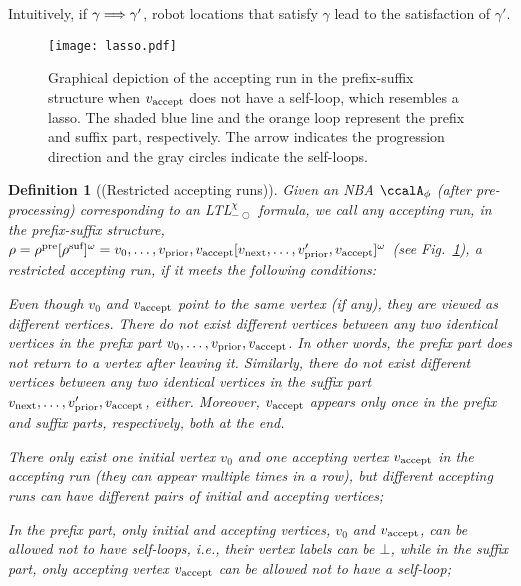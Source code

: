 \documentclass[Afour,sageh,times]{sagej}
\newtheorem{defn}[thm]{Definition}
\newcounter{listcounter}
\newenvironment{noindlist}
 {\begin{list}{(\alph{listcounter})~~}{\usecounter{listcounter} \labelsep=0em \labelwidth=0em \leftmargin=0em \itemindent=0em}}
 {\end{list}}
\newcommand{\ltlx}{ {\it LTL}$_{-\bigcirc}^\chi$ }
\newcommand{\autop}{\ccalA_{\phi}}
\newcommand{\vertex}[1]{v_{\textup{#1}}}
\newcommand{\simplies}{\DOTSB\Longrightarrow}
\begin{document}
 Intuitively, if $\gamma \simplies \gamma'$, robot locations that satisfy $\gamma$ lead to the satisfaction of $\gamma'$.

 \begin{figure}[t]
  \centering
  \texttt{[image: lasso.pdf]}
  \caption{Graphical depiction of the accepting run in the prefix-suffix structure when $\vertex{accept}$ does not have a self-loop, which resembles a lasso. The shaded blue line and the orange loop represent the prefix and suffix part, respectively. The arrow indicates the progression direction and the gray circles indicate the self-loops.}
  \label{fig:lasso}
\end{figure}


\begin{defn}[(Restricted accepting runs)]\label{defn:run}
  Given an NBA $\autop$ (after pre-processing) corresponding to an \ltlx formula, we call any accepting run, in the prefix-suffix structure, $\rho = \rho^{\textup{pre}} [\rho^{\textup{suf}}]^\omega= v_0, \ldots, \vertex{prior}, \vertex{accept} [\vertex{next}, \ldots, \vertex{prior}', \vertex{accept}]^\omega$ (see Fig.~\ref{fig:lasso}), a restricted accepting run,  if it  meets the following conditions:
  \begin{noindlist}
    \setlength\itemsep{0em}
  \item \label{cond:a} Even though $v_0 $ and $ \vertex{accept}$ point to the same vertex (if any), they are viewed as different vertices.  There do not exist different vertices between any two identical vertices  in the prefix part  $v_0, \ldots, \vertex{prior}, \vertex{accept}$. In other words, the prefix part does not return to a vertex after leaving it. Similarly, there do not exist different  vertices  between any two identical vertices in the suffix part  $\vertex{next}, \ldots, \vertex{prior}', \vertex{accept}$, either. Moreover,  $\vertex{accept}$ appears only once  in the prefix and suffix parts, respectively, both at the end.
  \item \label{cond:b} There only exist one initial vertex $v_0$ and one  accepting vertex $\vertex{accept}$ in the accepting run (they can appear multiple times in a row), but different accepting runs can have different pairs of initial and accepting vertices;
  \item \label{cond:c} In the prefix part, only initial and accepting vertices, $v_0$ and $\vertex{accept}$, can be allowed not to have  self-loops, i.e., their vertex labels  can be $\bot$, while in the suffix part,  only accepting vertex $\vertex{accept}$ can be allowed not to have a self-loop;

\end{noindlist}
\end{defn}
\end{document}
